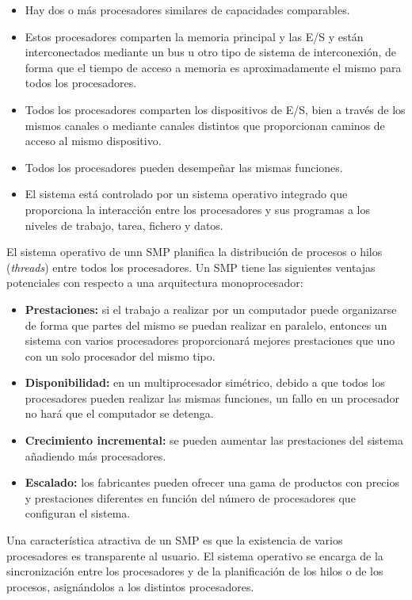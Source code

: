 \begin{itemize}
  \item Hay dos o más procesadores similares de capacidades comparables.
  \item Estos procesadores comparten la memoria principal y las E/S y están interconectados mediante un bus u otro tipo de sistema de interconexión, de forma que el tiempo de acceso a memoria es aproximadamente el mismo para todos los procesadores.
  \item Todos los procesadores comparten los dispositivos de E/S, bien a través de los mismos canales o mediante canales distintos que proporcionan caminos de acceso al mismo dispositivo.
  \item Todos los procesadores pueden desempeñar las mismas funciones.
  \item El sistema está controlado por un sistema operativo integrado que proporciona la interacción entre los procesadores y sus programas a los niveles de trabajo, tarea, fichero y datos.
\end{itemize}

El sistema operativo de unn SMP planifica la distribución de procesos o hilos (\textit{threads}) entre todos los procesadores. Un SMP tiene las siguientes ventajas potenciales con respecto a una arquitectura monoprocesador:

\begin{itemize}
  \item \textbf{Prestaciones:} si el trabajo a realizar por un computador puede organizarse de forma que partes del mismo se puedan realizar en paralelo, entonces un sistema con varios procesadores proporcionará mejores prestaciones que uno con un solo procesador del mismo tipo.
  \item \textbf{Disponibilidad:} en un multiprocesador simétrico, debido a que todos los procesadores pueden realizar las mismas funciones, un fallo en un procesador no hará que el computador se detenga.
  \item \textbf{Crecimiento incremental:} se pueden aumentar las prestaciones del sistema añadiendo más procesadores.
  \item \textbf{Escalado:} los fabricantes pueden ofrecer una gama de productos con precios y prestaciones diferentes en función del número de procesadores que configuran el sistema.
\end{itemize}

Una característica atractiva de un SMP es que la existencia de varios procesadores es transparente al usuario. El sistema operativo se encarga de la sincronización entre los procesadores y de la planificación de los hilos o de los procesos, asignándolos a los distintos procesadores.

